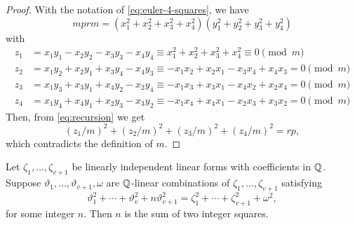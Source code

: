 \begin{proof}
    With the notation of \eqref{eq:euler-4-squares}, we have
    \begin{equation}\label{eq:recursion}
        mprm = (x_1^2+x_2^2+x_3^2+x_4^2)(y_1^2+y_2^2+y_3^2+y_4^2)
    \end{equation}
    with
    \begin{align*}
        z_1 &= x_1y_1 - x_2y_2 - x_3y_3 - x_4y_4
            \equiv x_1^2+x_2^2+x_3^2+x_4^2 \equiv0\pmod m\\
        z_2 &= x_1y_2 + x_2y_1 + x_3y_4 - x_4y_3
            \equiv -x_1x_2+x_2x_1-x_3x_4+x_4x_3=0\pmod m\\
        z_3 &= x_1y_3 + x_3y_1 + x_4y_2 - x_2y_4
            \equiv -x_1x_3+x_3x_1-x_4x_2+x_2x_4=0\pmod m\\
        z_4 &= x_1y_4 + x_4y_1 + x_2y_3 - x_3y_2
            \equiv -x_1x_4 + x_4x_1 -x_2x_3+x_3x_2=0\pmod m
    \end{align*}
    Then, from \eqref{eq:recursion} we get
    $$
        (z_1/m)^2 + (z_2/m)^2 +(z_3/m)^2 +(z_4/m)^2 = rp,
    $$
    which contradicts the definition of $m$.
\end{proof}

\begin{lem}\label{lem:quadratic-criterion-for-sum-of-squares}
    Let\/ $\zeta_1,\dots,\zeta_{v+1}$ be linearly independent linear forms with coefficients in\/ $\mathbb{Q}$. Suppose\/ $\vartheta_1,\dots,\vartheta_{v+1},\omega$ are\/ $\mathbb{Q}$-linear combinations of\/ $\zeta_1,\dots,\zeta_{v+1}$ satisfying
    \begin{equation}\label{eq:minimum-v}
        \vartheta_1^2+\cdots+\vartheta_v^2 + n\vartheta_{v+1}^2
            = \zeta_1^2+\cdots+\zeta_{v+1}^2 + \omega^2,
    \end{equation}
    for some integer\/ $n$. Then\/ $n$ is the sum of two integer squares.
\end{lem}

